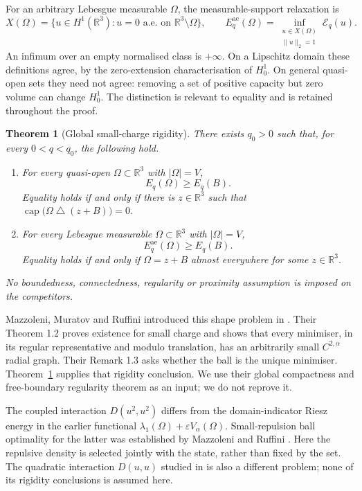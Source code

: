 \documentclass[11pt,a4paper]{article}
\newtheorem{theorem}{Theorem}[section]
\theoremstyle{definition}
\theoremstyle{remark}
\DeclareMathOperator{\capop}{cap}
\newcommand{\R}{\mathbb R}
\newcommand{\aesp}{\mathrm{ae}}
\begin{document}
For an arbitrary Lebesgue measurable $\Omega$, the measurable-support relaxation is
\[
 X(\Omega)=\{u\in H^1(\R^3):u=0\text{ a.e. on }\R^3\setminus\Omega\},
 \qquad
 E_q^{\aesp}(\Omega)=\inf_{\substack{u\in X(\Omega)\\\|u\|_2=1}}\mathcal E_q(u).
\]
An infimum over an empty normalised class is $+\infty$. On a Lipschitz domain these definitions agree, by the zero-extension characterisation of $H^1_0$. On general quasi-open sets they need not agree: removing a set of positive capacity but zero volume can change $H^1_0$. The distinction is relevant to equality and is retained throughout the proof.

\begin{theorem}[Global small-charge rigidity]\label{thm:main}
There exists $q_0>0$ such that, for every $0<q<q_0$, the following hold.
\begin{enumerate}[label=(\roman*)]
\item For every quasi-open $\Omega\subset\R^3$ with $|\Omega|=V$,
\[
 E_q(\Omega)\geq E_q(B).
\]
Equality holds if and only if there is $z\in\R^3$ such that
$\capop\bigl(\Omega\mathbin\triangle(z+B)\bigr)=0$.
\item For every Lebesgue measurable $\Omega\subset\R^3$ with $|\Omega|=V$,
\[
 E_q^{\aesp}(\Omega)\geq E_q(B).
\]
Equality holds if and only if $\Omega=z+B$ almost everywhere for some $z\in\R^3$.
\end{enumerate}
No boundedness, connectedness, regularity or proximity assumption is imposed on the competitors.
\end{theorem}

Mazzoleni, Muratov and Ruffini introduced this shape problem in \cite{MMR2025}. Their Theorem 1.2 proves existence for small charge and shows that every minimiser, in its regular representative and modulo translation, has an arbitrarily small $C^{2,\alpha}$ radial graph. Their Remark 1.3 asks whether the ball is the unique minimiser. Theorem~\ref{thm:main} supplies that rigidity conclusion. We use their global compactness and free-boundary regularity theorem as an input; we do not reprove it.

The coupled interaction $D(u^2,u^2)$ differs from the domain-indicator Riesz energy in the earlier functional $\lambda_1(\Omega)+\varepsilon V_\alpha(\Omega)$. Small-repulsion ball optimality for the latter was established by Mazzoleni and Ruffini \cite{MazzoleniRuffini2021}. Here the repulsive density is selected jointly with the state, rather than fixed by the set. The quadratic interaction $D(u,u)$ studied in \cite{MMR2026quadratic} is also a different problem; none of its rigidity conclusions is assumed here.
\end{document}

